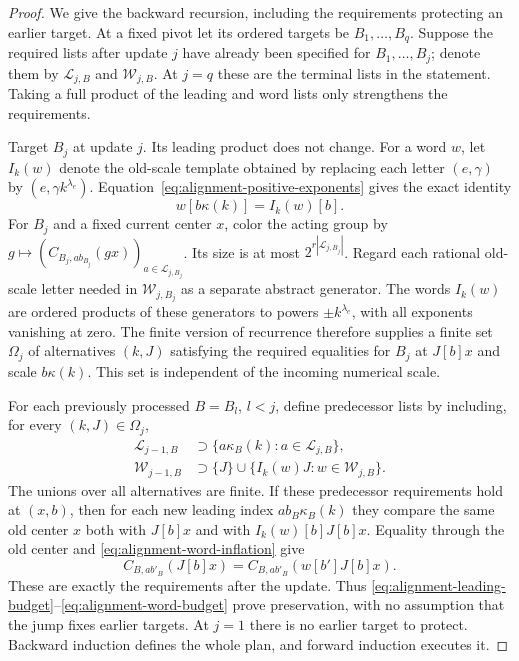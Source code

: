 \begin{proof}
We give the backward recursion, including the requirements protecting
an earlier target.  At a fixed pivot let its ordered targets be
$B_1,\ldots,B_q$.  Suppose the required lists after update $j$ have
already been specified for $B_1,\ldots,B_j$; denote them by
$\mathcal L_{j,B}$ and $\mathcal W_{j,B}$.  At $j=q$ these are the
terminal lists in the statement.  Taking a full product of the leading
and word lists only strengthens the requirements.

Target $B_j$ at update $j$.  Its leading product does not change.
For a word $w$, let $I_k(w)$ denote the old-scale template obtained by
replacing each letter $(e,\gamma)$ by
$(e,\gamma k^{\lambda_e})$.  Equation~\eqref{eq:alignment-positive-exponents}
gives the exact identity
\begin{equation}\label{eq:alignment-word-inflation}
 w[b\kappa(k)]=I_k(w)[b].
\end{equation}
For $B_j$ and a fixed current center $x$, color the acting group by
$g\mapsto(C_{B_j,a b_{B_j}}(g x))_{a\in\mathcal L_{j,B_j}}$.
Its size is at most $2^{r|\mathcal L_{j,B_j}|}$.
Regard each rational old-scale letter needed in
$\mathcal W_{j,B_j}$ as a separate abstract generator.  The words
$I_k(w)$ are ordered products of these generators to powers
$\pm k^{\lambda_e}$, with all exponents vanishing at zero.
The finite version of recurrence therefore supplies a finite set
$\Omega_j$ of alternatives $(k,J)$ satisfying the required equalities
for $B_j$ at $J[b]x$ and scale $b\kappa(k)$.  This set is independent
of the incoming numerical scale.

For each previously processed $B=B_l$, $l<j$, define predecessor lists
by including, for every $(k,J)\in\Omega_j$,
\begin{align}
 \mathcal L_{j-1,B}&\supset
   \{a\kappa_B(k):a\in\mathcal L_{j,B}\},
       \label{eq:alignment-leading-budget}\\
 \mathcal W_{j-1,B}&\supset
   \{J\}\cup\{I_k(w)J:w\in\mathcal W_{j,B}\}.
       \label{eq:alignment-word-budget}
\end{align}
The unions over all alternatives are finite.  If these predecessor
requirements hold at $(x,b)$, then for each new leading index
$a b_B\kappa_B(k)$ they compare the same old center $x$ both with
$J[b]x$ and with $I_k(w)[b]J[b]x$.  Equality through the old center and
\eqref{eq:alignment-word-inflation} give
\[
 C_{B,a b'_B}(J[b]x)
   =C_{B,a b'_B}(w[b']J[b]x).
\]
These are exactly the requirements after the update.  Thus
\eqref{eq:alignment-leading-budget}--\eqref{eq:alignment-word-budget}
prove preservation, with no assumption that the jump fixes earlier
targets.  At $j=1$ there is no earlier target to protect.  Backward
induction defines the whole plan, and forward induction executes it.


\end{proof}
